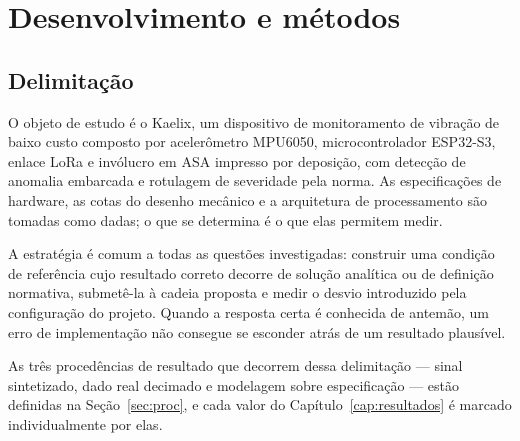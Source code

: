 
\makeatletter
{}
\makeatother

\providecommand{\kxfig}[1]{../../experiments/figures/output/#1}
\providecommand{\kxhw}[1]{../../#1}

\chapter{Desenvolvimento e métodos}
\label{cap:desenvolvimento}

\section{Delimitação}
\label{sec:dev-delimitacao}

O objeto de estudo é o Kaelix, um dispositivo de monitoramento de vibração de baixo custo
composto por acelerômetro MPU6050, microcontrolador ESP32-S3, enlace LoRa e invólucro em
ASA impresso por deposição, com detecção de anomalia embarcada e rotulagem de severidade
pela norma. As especificações de hardware, as cotas do desenho mecânico e a arquitetura de
processamento são tomadas como dadas; o que se determina é o que elas permitem medir.

A estratégia é comum a todas as questões investigadas: construir uma condição de referência
cujo resultado correto decorre de solução analítica ou de definição normativa, submetê-la à
cadeia proposta e medir o desvio introduzido pela configuração do projeto. Quando a
resposta certa é conhecida de antemão, um erro de implementação não consegue se esconder
atrás de um resultado plausível.

 As três procedências de resultado que decorrem dessa delimitação
--- sinal sintetizado, dado real decimado e modelagem sobre especificação --- estão
definidas na Seção~\ref{sec:proc}, e cada valor do Capítulo~\ref{cap:resultados} é marcado
individualmente por elas.

